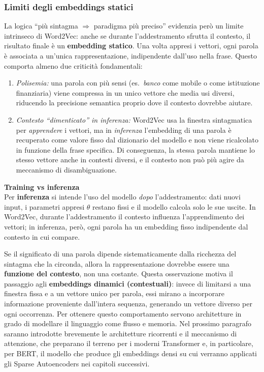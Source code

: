\subsubsection{Limiti degli embeddings statici}
\label{subsubsec:static_limits}
La logica ``più sintagma $\Rightarrow$ paradigma più preciso'' evidenzia però un limite intrinseco di Word2Vec: anche se durante l'addestramento sfrutta il contesto, il risultato finale è un \textbf{embedding statico}. Una volta appresi i vettori, ogni parola è associata a un'unica rappresentazione, indipendente dall'uso nella frase. Questo comporta almeno due criticità fondamentali:
\begin{enumerate}
    \item \textit{Polisemia:} una parola con più sensi (es.\ \textit{banco} come mobile o come istituzione finanziaria) viene compressa in un unico vettore che media usi diversi, riducendo la precisione semantica proprio dove il contesto dovrebbe aiutare.
    \item \textit{Contesto ``dimenticato'' in inferenza:} Word2Vec usa la finestra sintagmatica per \emph{apprendere} i vettori, ma in \textit{inferenza} l'embedding di una parola è recuperato come valore fisso dal dizionario del modello e non viene ricalcolato in funzione della frase specifica. Di conseguenza, la stessa parola mantiene lo stesso vettore anche in contesti diversi, e il contesto non può più agire da meccanismo di disambiguazione.
\end{enumerate}
\begin{notebox}
\textbf{Training vs inferenza}\\
Per \textbf{inferenza} si intende l'uso del modello \emph{dopo} l'addestramento: dati nuovi input, i parametri appresi $\theta$ restano fissi e il modello calcola solo le sue uscite. In Word2Vec, durante l'addestramento il contesto influenza l'apprendimento dei vettori; in inferenza, però, ogni parola ha un embedding fisso indipendente dal contesto in cui compare.
\end{notebox}
Se il significato di una parola dipende sistematicamente dalla ricchezza del sintagma che la circonda, allora la rappresentazione dovrebbe essere una \textbf{funzione del contesto}, non una costante. Questa osservazione motiva il passaggio agli \textbf{embeddings dinamici (contestuali)}: invece di limitarsi a una finestra fissa e a un vettore unico per parola, essi mirano a incorporare informazione proveniente dall'intera sequenza, generando un vettore diverso per ogni occorrenza. 
Per ottenere questo comportamento servono architetture in grado di modellare il linguaggio come flusso e memoria. Nel prossimo paragrafo saranno introdotte brevemente le architetture ricorrenti e il meccanismo di attenzione, che preparano il terreno per i moderni Transformer e, in particolare, per BERT, il modello che produce gli embeddings densi su cui verranno applicati gli Sparse Autoencoders nei capitoli successivi.


